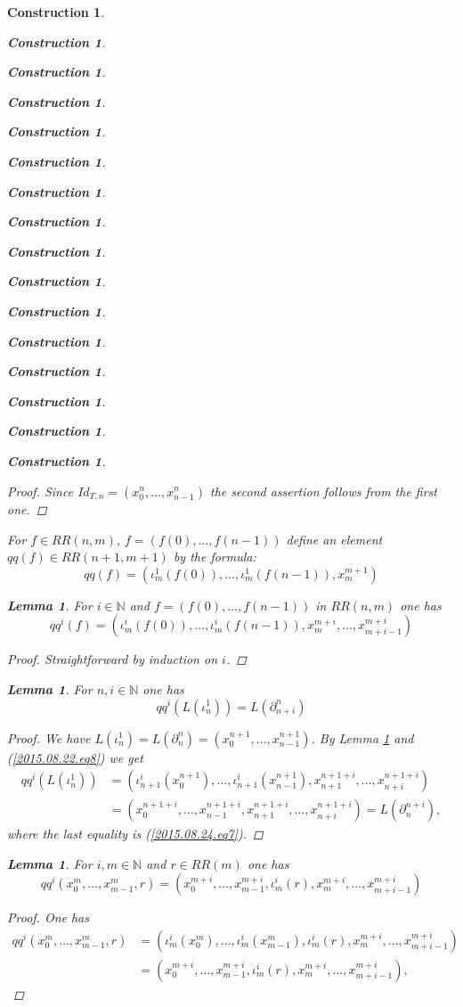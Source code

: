 \documentclass[onecolumn,12pt]{amsart}
\newtheorem{lemma}[proposition]{Lemma}
\numberwithin{proposition}{subsection}
\newtheorem{construction}[proposition]{Construction}
\newcommand{\nn}{{\mathbb N}}
\newcommand{\nat}{\nn}
\begin{document}
\begin{construction}
\begin{construction}
\begin{construction}
\begin{construction}
\begin{construction}
\begin{construction}
\begin{construction}
\begin{construction}
\begin{construction}
\begin{construction}
\begin{construction}
\begin{construction}
\begin{construction}
\begin{construction}
\begin{construction}
\begin{construction}
\begin{proof}
Since $Id_{T,n}=(x_0^n,\dots,x_{n-1}^n)$ the second assertion follows from the first one.
\end{proof}
%
For $f\in RR(n,m)$, $f=(f(0),\dots,f(n-1))$ define an element $qq(f)\in RR(n+1,m+1)$ by the formula: 
%
\begin{equation}\label{2015.08.26.eq9}
qq(f)=(\iota_m^1(f(0)),\dots,\iota_m^1(f(n-1)),x_m^{m+1})
\end{equation}%
%
\begin{lemma}
\label{2015.08.26.l2}
For $i\in\nat$ and $f=(f(0),\dots,f(n-1))$ in $RR(n,m)$ one has
%
$$qq^i(f)=(\iota_m^i(f(0)),\dots,\iota_m^i(f(n-1)),x_m^{m+i},\dots,x_{m+i-1}^{m+i})$$
%
\end{lemma}
%
\begin{proof}
Straightforward by induction on $i$.
\end{proof}
%
\begin{lemma}
\label{2015.08.26.l3a}
For $n,i\in\nat$ one has
%
$$qq^i(L(\iota_n^1))=L(\partial^n_{n+i})$$
%
\end{lemma}
%
\begin{proof}
We have ${L}(\iota_n^1)=L(\partial_n^n)=(x_0^{n+1},\dots,x^{n+1}_{n-1})$. By
Lemma \ref{2015.08.26.l2} and (\ref{2015.08.22.eq8}) we get
\begin{equation*}
  \begin{split}
    qq^i({L}(\iota_n^1))&=(\iota_{n+1}^i(x_0^{n+1}),\dots,\iota_{n+1}^i(x_{n-1}^{n+1}),x_{n+1}^{n+1+i},\dots,x_{n+i}^{n+1+i})
    \\
    &=(x_0^{n+1+i},\dots,x_{n-1}^{n+1+i},x_{n+1}^{n+1+i},\dots,x_{n+i}^{n+1+i})=L(\partial_n^{n+i}),
  \end{split}
\end{equation*}
where the last equality is (\ref{2015.08.24.eq7}). 
\end{proof}
%
\begin{lemma}
\label{2015.08.28.l1}
For $i,m\in\nat$ and $r\in RR(m)$ one has
%
$$qq^i(x_0^m,\dots,x^m_{m-1},r)=(x_0^{m+i},\dots,x^{m+i}_{m-1},\iota_m^i(r),x_m^{m+i},\dots,x_{m+i-1}^{m+i})$$
%
\end{lemma}
%
\begin{proof}
One has
\begin{equation*}
  \begin{split}
    qq^i(x_0^m,\dots,x^m_{m-1},r)&=(\iota_m^i(x_0^m),\dots,\iota_m^i(x^m_{m-1}),\iota_m^i(r),x_m^{m+i},\dots,x_{m+i-1}^{m+i})
    \\&=(x_0^{m+i},\dots,x^{m+i}_{m-1},\iota_m^i(r),x_m^{m+i},\dots,x_{m+i-1}^{m+i}),
  \end{split}

\end{equation*}
\end{proof}
\end{construction}
\end{construction}
\end{construction}
\end{construction}
\end{construction}
\end{construction}
\end{construction}
\end{construction}
\end{construction}
\end{construction}
\end{construction}
\end{construction}
\end{construction}
\end{construction}
\end{construction}
\end{construction}
\end{document}
